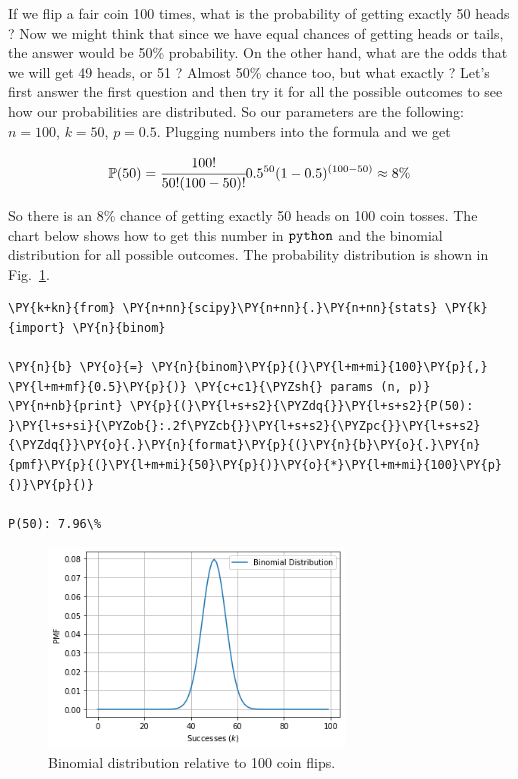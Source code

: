 If we flip a fair coin 100 times, what is the probability of getting
exactly 50 heads ? Now we might think that since we have equal chances
of getting heads or tails, the answer would be 50\% probability. On the
other hand, what are the odds that we will get 49 heads, or 51 ? Almost
50\% chance too, but what exactly ? Let's first answer the first
question and then try it for all the possible outcomes to see how our
probabilities are distributed. So our parameters are the following:
\(n = 100\), \(k = 50\), \(p = 0.5\). Plugging numbers into the formula
and we get

\[\mathbb{P}(50) = \cfrac{100!}{50!(100 - 50)!}0.5^{50}(1-0.5)^{(100-50)} \approx 8\% \]

So there is an 8\% chance of getting exactly 50 heads on 100 coin
tosses. The chart below shows how to get this number in \(\tt{python}\)
and the binomial distribution for all possible outcomes. The probability distribution
is shown in Fig.~\ref{fig:binomial_coin_flip}.

\begin{tcolorbox}[breakable, size=fbox, boxrule=1pt, pad at break*=1mm,colback=cellbackground, colframe=cellborder]
\begin{Verbatim}[commandchars=\\\{\}]
\PY{k+kn}{from} \PY{n+nn}{scipy}\PY{n+nn}{.}\PY{n+nn}{stats} \PY{k}{import} \PY{n}{binom}

\PY{n}{b} \PY{o}{=} \PY{n}{binom}\PY{p}{(}\PY{l+m+mi}{100}\PY{p}{,} \PY{l+m+mf}{0.5}\PY{p}{)} \PY{c+c1}{\PYZsh{} params (n, p)}
\PY{n+nb}{print} \PY{p}{(}\PY{l+s+s2}{\PYZdq{}}\PY{l+s+s2}{P(50): }\PY{l+s+si}{\PYZob{}:.2f\PYZcb{}}\PY{l+s+s2}{\PYZpc{}}\PY{l+s+s2}{\PYZdq{}}\PY{o}{.}\PY{n}{format}\PY{p}{(}\PY{n}{b}\PY{o}{.}\PY{n}{pmf}\PY{p}{(}\PY{l+m+mi}{50}\PY{p}{)}\PY{o}{*}\PY{l+m+mi}{100}\PY{p}{)}\PY{p}{)}

P(50): 7.96\%
\end{Verbatim}
\end{tcolorbox}

\begin{figure}[ht]
\centering
    \includegraphics[width=0.7\textwidth]{figures/binomial_2_0.png}
    \caption{Binomial distribution relative to 100 coin flips.}
    \label{fig:binomial_coin_flip}
\end{figure}
    
